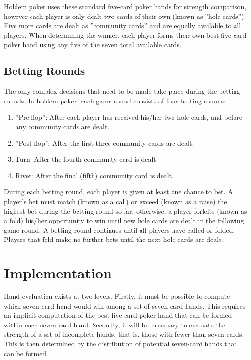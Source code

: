 Holdem poker uses these standard five-card poker hands for strength comparison, however each player is only dealt two cards of their own (known as ''hole cards'').
Five more cards are dealt as ''community cards'' and are equally available to all players.
When determining the winner, each player forms their own best five-card poker hand using any five of the seven total available cards.


\subsection{Betting Rounds}
\label{sec:BettingRounds}

The only complex decisions that need to be made take place during the betting rounds.
In holdem poker, each game round consists of four betting rounds:
\begin{enumerate}
\singlespacing
\item ''Pre-flop'': After each player has received his/her two hole cards, and before any community cards are dealt.
\item ''Post-flop'': After the first three community cards are dealt.
\item Turn: After the fourth community card is dealt.
\item River: After the final (fifth) community card is dealt.
\end{enumerate}

During each betting round, each player is given at least one chance to bet.
A player's bet must match (known as a call) or exceed (known as a raise) the highest bet during the betting round so far, otherwise, a player forfeits (known as a fold) his/her opportunity to win until new hole cards are dealt in the following game round.
A betting round continues until all players have called or folded.
Players that fold make no further bets until the next hole cards are dealt.

\section{Implementation}
\label{sec:HandEvaluationImplementation}

Hand evaluation exists at two levels.
Firstly, it must be possible to compute which seven-card hand would win among a set of seven-card hands.
This requires an implicit computation of the best five-card poker hand that can be formed within each seven-card hand.
Secondly, it will be necessary to evaluate the strength of a set of incomplete hands, that is, those with fewer than seven cards.
This is then determined by the distribution of potential seven-card hands that can be formed.

